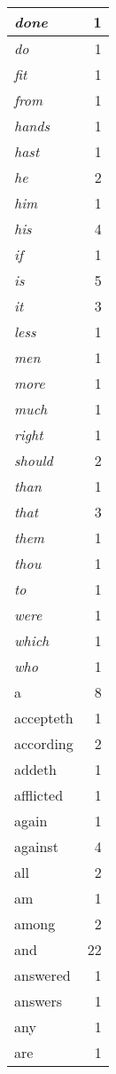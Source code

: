 \begin{center}
\begin{longtable}{l|r}
\emph{done} & 1 \\ \hline
\emph{do} & 1 \\ \hline
\emph{fit} & 1 \\ \hline
\emph{from} & 1 \\ \hline
\emph{hands} & 1 \\ \hline
\emph{hast} & 1 \\ \hline
\emph{he} & 2 \\ \hline
\emph{him} & 1 \\ \hline
\emph{his} & 4 \\ \hline
\emph{if} & 1 \\ \hline
\emph{is} & 5 \\ \hline
\emph{it} & 3 \\ \hline
\emph{less} & 1 \\ \hline
\emph{men} & 1 \\ \hline
\emph{more} & 1 \\ \hline
\emph{much} & 1 \\ \hline
\emph{right} & 1 \\ \hline
\emph{should} & 2 \\ \hline
\emph{than} & 1 \\ \hline
\emph{that} & 3 \\ \hline
\emph{them} & 1 \\ \hline
\emph{thou} & 1 \\ \hline
\emph{to} & 1 \\ \hline
\emph{were} & 1 \\ \hline
\emph{which} & 1 \\ \hline
\emph{who} & 1 \\ \hline
a & 8 \\ \hline
accepteth & 1 \\ \hline
according & 2 \\ \hline
addeth & 1 \\ \hline
afflicted & 1 \\ \hline
again & 1 \\ \hline
against & 4 \\ \hline
all & 2 \\ \hline
am & 1 \\ \hline
among & 2 \\ \hline
and & 22 \\ \hline
answered & 1 \\ \hline
answers & 1 \\ \hline
any & 1 \\ \hline
are & 1 \\ \hline

\end{longtable}
\end{center}
